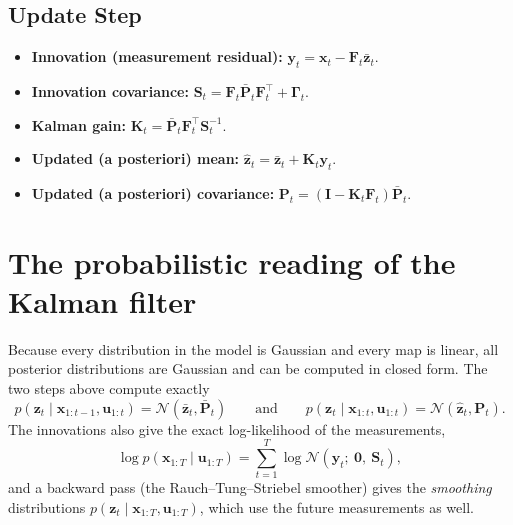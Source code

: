 \subsection{Update Step}
\begin{itemize}
    \item \textbf{Innovation (measurement residual):}\quad
    $\mathbf{y}_t = \mathbf{x}_t - \mathbf{F}_t \bar{\mathbf{z}}_{t}$.
    \item \textbf{Innovation covariance:}\quad
    $\mathbf{S}_t = \mathbf{F}_t \bar{\mathbf{P}}_{t} \mathbf{F}_t^\top
    + \boldsymbol{\Gamma}_{t}$.
    \item \textbf{Kalman gain:}\quad
    $\mathbf{K}_t = \bar{\mathbf{P}}_{t} \mathbf{F}_t^\top
    \mathbf{S}_t^{-1}$.
    \item \textbf{Updated (a posteriori) mean:}\quad
    $\hat{\mathbf{z}}_{t} = \bar{\mathbf{z}}_{t} + \mathbf{K}_t
    \mathbf{y}_t$.
    \item \textbf{Updated (a posteriori) covariance:}\quad
    $\mathbf{P}_{t} = (\mathbf{I} - \mathbf{K}_t \mathbf{F}_t)
    \bar{\mathbf{P}}_{t}$.
\end{itemize}

\section{The probabilistic reading of the Kalman filter}

Because every distribution in the model is Gaussian and every map is
linear, all posterior distributions are Gaussian and can be computed in
closed form. The two steps above compute exactly
\begin{equation*}
    p(\mathbf{z}_t \mid \mathbf{x}_{1:t-1}, \mathbf{u}_{1:t}) =
    \mathcal{N}(\bar{\mathbf{z}}_{t}, \bar{\mathbf{P}}_{t})
    \qquad\text{and}\qquad
    p(\mathbf{z}_t \mid \mathbf{x}_{1:t}, \mathbf{u}_{1:t}) =
    \mathcal{N}(\hat{\mathbf{z}}_{t}, \mathbf{P}_{t}).
\end{equation*}
The innovations also give the exact log-likelihood of the measurements,
\begin{equation*}
    \log p(\mathbf{x}_{1:T} \mid \mathbf{u}_{1:T}) =
    \sum_{t=1}^{T} \log \mathcal{N}(\mathbf{y}_t;\ \mathbf{0},\
    \mathbf{S}_t),
\end{equation*}
and a backward pass (the Rauch--Tung--Striebel smoother) gives the
\emph{smoothing} distributions
$p(\mathbf{z}_t \mid \mathbf{x}_{1:T}, \mathbf{u}_{1:T})$, which use the
future measurements as well.

